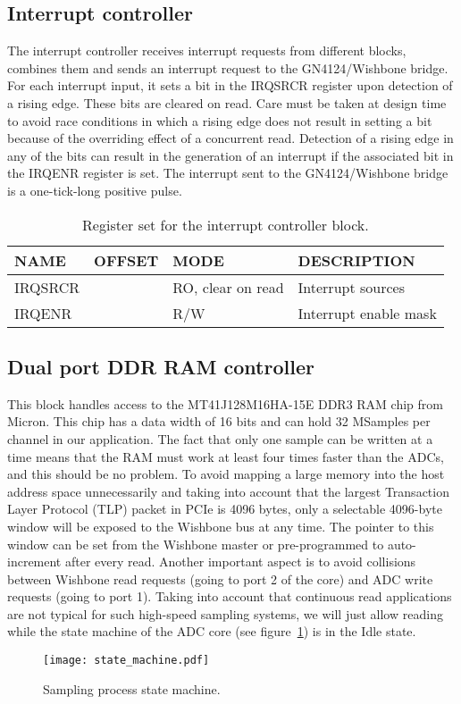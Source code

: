 \documentclass{article}
\begin{document}
\subsection{Interrupt controller}
The interrupt controller receives interrupt requests from different blocks, combines them and sends an interrupt request to the GN4124/Wishbone bridge. For each interrupt input, it sets a bit in the IRQSRCR register upon detection of a rising edge. These bits are cleared on read. Care must be taken at design time to avoid race conditions in which a rising edge does not result in setting a bit because of the overriding effect of a concurrent read. Detection of a rising edge in any of the bits can result in the generation of an interrupt if the associated bit in the IRQENR register is set. The interrupt sent to the GN4124/Wishbone bridge is a one-tick-long positive pulse.

\begin{table}[htbp]
  \centering
  \begin{tabularx}{\textwidth}{|l|r|l|X|}
    \hline
    \textbf{NAME} & \textbf{OFFSET} & \textbf{MODE} & \textbf{DESCRIPTION} \\
    \hline
    \hline
    IRQSRCR & & RO, clear on read & Interrupt sources\\
    \hline
    IRQENR & & R/W & Interrupt enable mask\\
    \hline
  \end{tabularx}
  \caption{Register set for the interrupt controller block.}
  \label{tab:irq_control}
\end{table}

\subsection{Dual port DDR RAM controller}
This block handles access to the MT41J128M16HA-15E DDR3 RAM chip from Micron. This chip has a data width of 16 bits and can hold 32 MSamples per channel in our application. The fact that only one sample can be written at a time means that the RAM must work at least four times faster than the ADCs, and this should be no problem. To avoid mapping a large memory into the host address space unnecessarily and taking into account that the largest Transaction Layer Protocol (TLP) packet in PCIe is 4096 bytes, only a selectable 4096-byte window will be exposed to the Wishbone bus at any time. The pointer to this window can be set from the Wishbone master or pre-programmed to auto-increment after every read. Another important aspect is to avoid collisions between Wishbone read requests (going to port 2 of the core) and ADC write requests (going to port 1). Taking into account that continuous read applications are not typical for such high-speed sampling systems, we will just allow reading while the state machine of the ADC core (see figure~\ref{fig:state_machine}) is in the Idle state. 

\begin{figure}[htbp]
  \centering
  \texttt{[image: state\_machine.pdf]}
  \caption{Sampling process state machine.}
  \label{fig:state_machine}
\end{figure}
\end{document}
